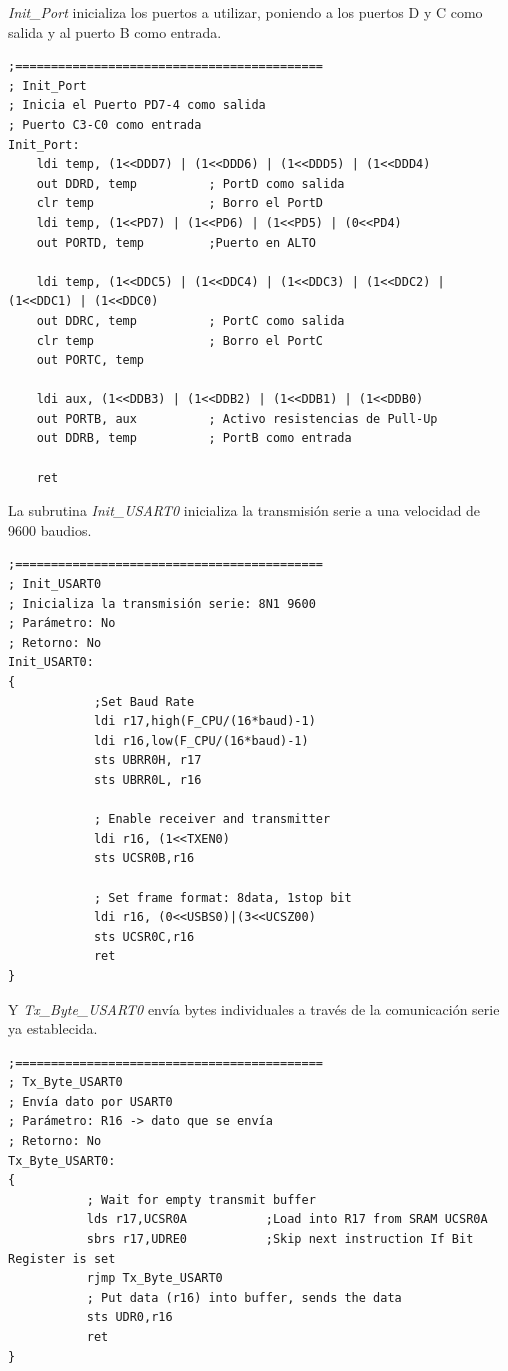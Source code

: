 \documentclass[a4paper, 12pt]{article}
\begin{document}
\textit{Init\_Port} inicializa los puertos a utilizar, poniendo a los puertos D y C como salida y al puerto B como entrada.

\begin{lstlisting} 
;===========================================
; Init_Port
; Inicia el Puerto PD7-4 como salida
; Puerto C3-C0 como entrada
Init_Port:
	ldi temp, (1<<DDD7) | (1<<DDD6) | (1<<DDD5) | (1<<DDD4)
	out DDRD, temp			; PortD como salida
	clr temp				; Borro el PortD
	ldi temp, (1<<PD7) | (1<<PD6) | (1<<PD5) | (0<<PD4)
	out PORTD, temp			;Puerto en ALTO

	ldi temp, (1<<DDC5) | (1<<DDC4) | (1<<DDC3) | (1<<DDC2) | (1<<DDC1) | (1<<DDC0)
	out DDRC, temp			; PortC como salida
	clr temp				; Borro el PortC
	out PORTC, temp
	
	ldi aux, (1<<DDB3) | (1<<DDB2) | (1<<DDB1) | (1<<DDB0)
	out PORTB, aux			; Activo resistencias de Pull-Up
	out DDRB, temp			; PortB como entrada

	ret
\end{lstlisting}	  

La subrutina \textit{Init\_USART0} inicializa la transmisión serie a una velocidad de 9600 baudios.

\begin{lstlisting}
;===========================================
; Init_USART0
; Inicializa la transmisión serie: 8N1 9600
; Parámetro: No
; Retorno: No
Init_USART0:
{
			;Set Baud Rate
			ldi	r17,high(F_CPU/(16*baud)-1)	
			ldi	r16,low(F_CPU/(16*baud)-1)	
			sts UBRR0H, r17
			sts UBRR0L, r16
			
			; Enable receiver and transmitter
			ldi r16, (1<<TXEN0)		
			sts UCSR0B,r16

			; Set frame format: 8data, 1stop bit
			ldi r16, (0<<USBS0)|(3<<UCSZ00)		
			sts UCSR0C,r16
			ret
}
\end{lstlisting}

Y \textit{Tx\_Byte\_USART0} envía bytes individuales a través de la comunicación serie ya establecida.

\begin{lstlisting}
;===========================================
; Tx_Byte_USART0
; Envía dato por USART0
; Parámetro: R16 -> dato que se envía
; Retorno: No
Tx_Byte_USART0:
{
		   ; Wait for empty transmit buffer
		   lds r17,UCSR0A			;Load into R17 from SRAM UCSR0A         
		   sbrs r17,UDRE0			;Skip next instruction If Bit Register is set
		   rjmp Tx_Byte_USART0
		   ; Put data (r16) into buffer, sends the data
		   sts UDR0,r16
		   ret
}
\end{lstlisting}
\end{document}

